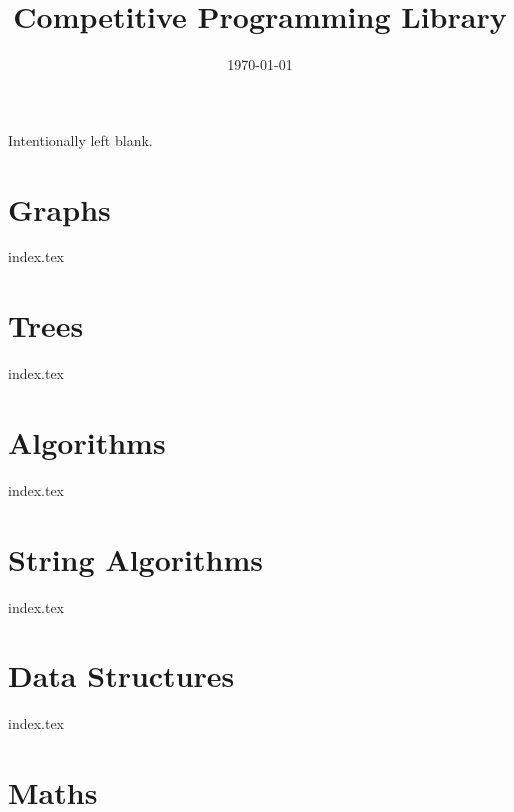 \documentclass{article}
\title{\textbf{Competitive Programming Library}}
\date{\today}
\author{}
\begin{document}
\maketitle

\newpage

\vspace*{\fill}
\begin{center}
  Intentionally left blank.
\end{center}
\vspace*{\fill}

\newpage

\tableofcontents

\newpage

\section{Graphs}

{index.tex}

\newpage

\section{Trees}

{index.tex}

\newpage

\section{Algorithms}

{index.tex}

\newpage

\section{String Algorithms}

{index.tex}

\newpage

\section{Data Structures}

{index.tex}

\newpage

\section{Maths}
\end{document}
